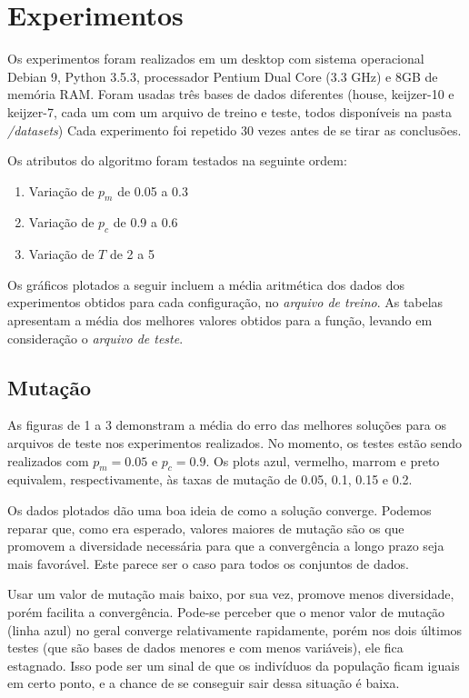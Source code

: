 \documentclass[11pt]{article}
\begin{document}
\section{Experimentos}

Os experimentos foram realizados em um desktop com sistema operacional Debian 9, Python 3.5.3, processador Pentium Dual Core (3.3 GHz) e 8GB de memória RAM. Foram usadas três bases de dados diferentes (house, keijzer-10 e keijzer-7, cada um com um arquivo de treino e teste, todos disponíveis na pasta \textit{/datasets}) Cada experimento foi repetido 30 vezes antes de se tirar as conclusões.

Os atributos do algoritmo foram testados na seguinte ordem:

\begin{enumerate}
	\item Variação de $p_m$ de 0.05 a 0.3
	\item Variação de $p_c$ de 0.9 a 0.6
	\item Variação de $T$ de 2 a 5
\end{enumerate}

Os gráficos plotados a seguir incluem a média aritmética dos dados dos experimentos obtidos para cada configuração, no \textit{arquivo de treino}. As tabelas apresentam a média dos melhores valores obtidos para a função, levando em consideração o \textit{arquivo de teste}.

\subsection{Mutação}

As figuras de 1 a 3 demonstram a média do erro das melhores soluções para os arquivos de teste nos experimentos realizados. No momento, os testes estão sendo realizados com $p_m = 0.05$ e $p_c = 0.9$. Os plots azul, vermelho, marrom e preto equivalem, respectivamente, às taxas de mutação de 0.05, 0.1, 0.15 e 0.2.

Os dados plotados dão uma boa ideia de como a solução converge. Podemos reparar que, como era esperado, valores maiores de mutação são os que promovem a diversidade necessária para que a convergência a longo prazo seja mais favorável. Este parece ser o caso para todos os conjuntos de dados.

Usar um valor de mutação mais baixo, por sua vez, promove menos diversidade, porém facilita a convergência. Pode-se perceber que o menor valor de mutação (linha azul) no geral converge relativamente rapidamente, porém nos dois últimos testes (que são bases de dados menores e com menos variáveis), ele fica estagnado. Isso pode ser um sinal de que os indivíduos da população ficam iguais em certo ponto, e a chance de se conseguir sair dessa situação é baixa.
\end{document}
